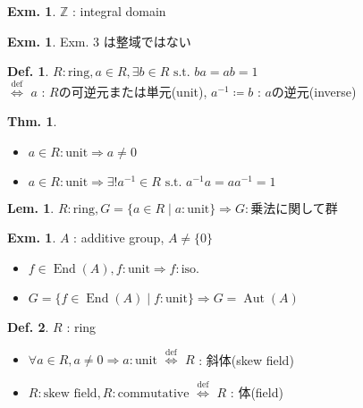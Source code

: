 \documentclass[uplatex,dvipdfmx,9pt]{beamer}
\newcommand{\defarrow}{\overset{\mathrm{def}}{\Leftrightarrow}}
\newcommand{\inverse}[1]{#1^{-1}}
\newcommand{\st}{\text{ s.t. }}
\newcommand{\End}[1]{\operatorname{End}(#1)}
\newcommand{\Aut}[1]{\operatorname{Aut}(#1)}
\newcommand{\Z}{\mathbb{Z}}
\newcounter{textLemCount}
\newcounter{textExmCount}
\theoremstyle{definition} %
\newtheorem{defn}{Def.}[subsection] %
\newtheorem{thm}{Thm.}[subsection] %
\newtheorem{lemText}[textLemCount]{Lem.} %
\theoremstyle{example}
\newtheorem{exmText}[textExmCount]{Exm.}
\begin{document}
\begin{frame}

  \begin{exmText}
    $\Z$ : integral domain
  \end{exmText}

  \begin{exmText}
     Exm. 3 は整域ではない
  \end{exmText}

  \begin{defn}
    $R : \text{ring}, a \in R, \exists b \in R \st ba = ab = 1$ \\
    $\defarrow$ $a$ : $R$の\alert{可逆元}または\alert{単元(unit)}, $\inverse{a} \coloneqq b$ : $a$の\alert{逆元(inverse)}
  \end{defn}

  \begin{thm}
    \begin{itemize}
      \item $a \in R : \text{unit} \Rightarrow a \ne 0$
      \item $a \in R : \text{unit} \Rightarrow \exists! \inverse{a} \in R \st \inverse{a}a = a\inverse{a} = 1$
    \end{itemize}
  \end{thm}

\end{frame}

\begin{frame}

  \begin{lemText}
    $R: \text{ring}, G = \{a \in R \mid a: \text{unit}\} \Rightarrow G: \text{乗法に関して群}$
  \end{lemText}

  \begin{exmText}
    $A$ : additive group, $A \ne \{0\}$
    \begin{itemize}
      \item $f \in \End{A}, f: \text{unit} \Rightarrow f: \text{iso.}$
      \item $G = \{f \in \End{A} \mid f: \text{unit}\} \Rightarrow G = \Aut{A}$
    \end{itemize}
  \end{exmText}

  \begin{defn}
    $R$ : ring
    \begin{itemize}
      \item $\forall a \in R, a \ne 0 \Rightarrow a: \text{unit}$ $\defarrow$ $R$ : \alert{斜体(skew field)}
      \item $R: \text{skew field}, R : \text{commutative}$ $\defarrow$ $R$ : \alert{体(field)}
    \end{itemize}
  \end{defn}

\end{frame}
\end{document}

